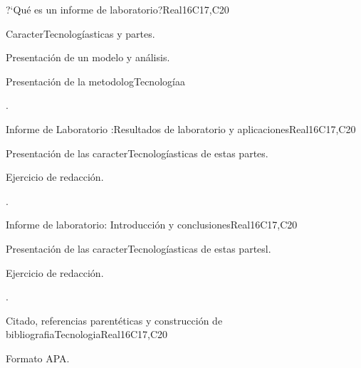\begin{syllabus}
\begin{unit}{?`Qué es un informe de laboratorio?}{}{Real}{16}{C17,C20}
  \begin{topics}
      \item CaracterTecnologíasticas y partes.
      \item Presentación de un modelo y análisis.
      \item Presentación de la metodologTecnologíaa 
  \end{topics}

  \begin{learningoutcomes}
   \item .%
  \end{learningoutcomes}
\end{unit}

\begin{unit}{Informe de Laboratorio :Resultados de laboratorio y aplicaciones}{}{Real}{16}{C17,C20}
  \begin{topics}
      \item Presentación de las caracterTecnologíasticas de estas partes.
      \item Ejercicio de redacción.
  \end{topics}

  \begin{learningoutcomes}
   \item .%
  \end{learningoutcomes}
\end{unit}

\begin{unit}{Informe de laboratorio: Introducción y conclusiones}{}{Real}{16}{C17,C20}
  \begin{topics}
      \item Presentación de las caracterTecnologíasticas de estas partesl.
      \item Ejercicio de redacción.
  \end{topics}

  \begin{learningoutcomes}
   \item .%
  \end{learningoutcomes}
\end{unit}

\begin{unit}{Citado, referencias parentéticas y construcción de bibliografiaTecnologia}{}{Real}{16}{C17,C20}
  \begin{topics}
      \item Formato APA.
  \end{topics}


\end{unit}
\end{syllabus}
